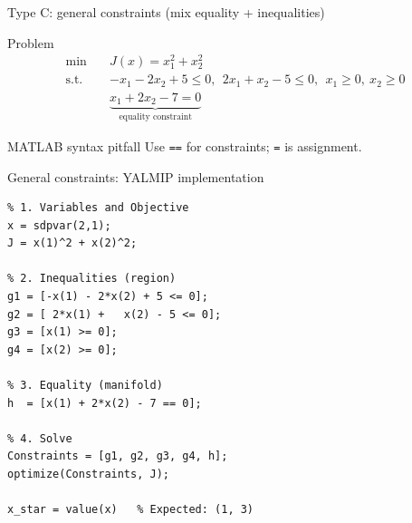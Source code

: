 \documentclass[aspectratio=169,10pt]{beamer}
\begin{document}
\begin{frame}[fragile]{Type C: general constraints (mix equality + inequalities)}
\begin{examplebox}{Problem}
\begin{equation*}
\begin{aligned}
\min\quad &J(x)=x_1^2+x_2^2\\
\text{s.t.}\quad
&-x_1-2x_2+5\le 0,\ \ 2x_1+x_2-5\le 0,\ \ x_1\ge0,\ x_2\ge0\\
&\underbrace{x_1+2x_2-7=0}_{\text{equality constraint}}
\end{aligned}
\end{equation*}
\end{examplebox}

\begin{notebox}{MATLAB syntax pitfall}
Use \texttt{==} for constraints; \texttt{=} is assignment.
\end{notebox}
\end{frame}

\begin{frame}[fragile]{General constraints: YALMIP implementation}
\begin{lstlisting}
% 1. Variables and Objective
x = sdpvar(2,1);
J = x(1)^2 + x(2)^2;

% 2. Inequalities (region)
g1 = [-x(1) - 2*x(2) + 5 <= 0];
g2 = [ 2*x(1) +   x(2) - 5 <= 0];
g3 = [x(1) >= 0];
g4 = [x(2) >= 0];

% 3. Equality (manifold)
h  = [x(1) + 2*x(2) - 7 == 0];

% 4. Solve
Constraints = [g1, g2, g3, g4, h];
optimize(Constraints, J);

x_star = value(x)   % Expected: (1, 3)
\end{lstlisting}
\end{frame}
\end{document}

